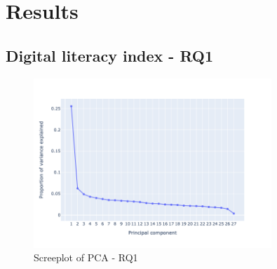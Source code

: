 \chapter{\label{ch:5-result}Results}

\section{Digital literacy index - RQ1}

\begin{figure}
    \centering
    \caption{Screeplot of PCA - RQ1}
    \label{fig:screeplot_rq1}
    \includegraphics[width=0.8\textwidth]{figures/pca_screeplot_q1.png}
\end{figure}



